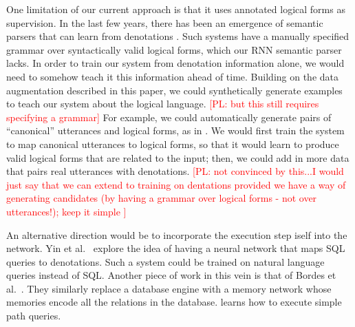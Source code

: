 \documentclass[11pt,letterpaper]{article}
\newcommand\pl[1]{\textcolor{red}{[PL: #1]}}
\begin{document}
One limitation of our current approach is that it 
uses annotated logical forms as supervision.
In the last few years, there has been an emergence of
semantic parsers that can learn from denotations 
\cite{clarke10world,liang11dcs,berant2013freebase,artzi2013weakly}.
Such systems have a manually specified grammar over
syntactically valid logical forms,
which our RNN semantic parser lacks.
In order to train our system from denotation information alone,
we would need to somehow teach it this information ahead of time.
Building on the data augmentation described in this paper,
we could synthetically generate examples
to teach our system about the logical language.
\pl{but this still requires specifying a grammar}
For example, we could automatically generate
pairs of ``canonical'' utterances and logical forms,
as in \cite{wang2015overnight}.  
We would first train the system to map
canonical utterances to logical forms, so that it would learn to produce
valid logical forms that are related to the input;
then, we could add in more data that pairs real utterances with denotations.
\pl{not convinced by this...I would just say 
  that we can extend to training on dentations
  provided we have a way of generating candidates (by having a grammar over logical forms - not over utterances!);
  keep it simple
}

An alternative direction would be to incorporate the execution
step iself into the network.  Yin et al.~
explore the idea of having a neural network that maps
SQL queries to denotations.  Such a system could be trained
on natural language queries instead of SQL.
Another piece of work in this vein is 
that of Bordes et al.~.
They similarly replace a database engine with a memory network
whose memories encode all the relations in the database.
 learns how to execute simple path queries.





\end{document}
